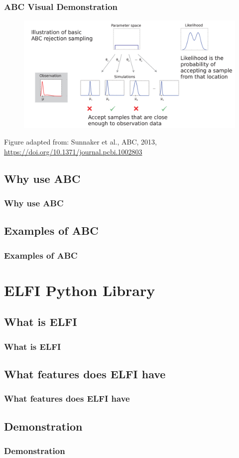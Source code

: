 \documentclass{beamer}
\begin{document}
\begin{frame}
\frametitle{ABC Visual Demonstration}
\vspace{-1em}
\begin{figure}[ht]
\centerline{\includegraphics[width=\columnwidth]{img/abc1.png}}
\end{figure}
\vspace{-1em}
\tiny{Figure adapted from: Sunnaker et al., ABC, 2013, \url{https://doi.org/10.1371/journal.pcbi.1002803}}
\end{frame}

\subsection{Why use ABC}

\begin{frame}
\frametitle{Why use ABC}
\end{frame}

\subsection{Examples of ABC}

\begin{frame}
\frametitle{Examples of ABC}
\end{frame}

\section{ELFI Python Library}

\subsection{What is ELFI}

\begin{frame}
\frametitle{What is ELFI}
\end{frame}

\subsection{What features does ELFI have}

\begin{frame}
\frametitle{What features does ELFI have}
\end{frame}

\subsection{Demonstration}

\begin{frame}
\frametitle{Demonstration}
\end{frame}
\end{document}
